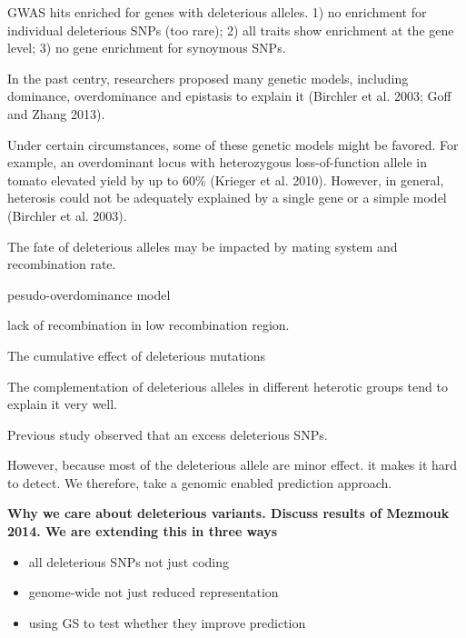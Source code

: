 \documentclass[10pt]{article}
\begin{document}
GWAS hits enriched for genes with deleterious alleles. 1) no enrichment for individual deleterious SNPs (too rare); 2) all traits show enrichment at the gene level; 3) no gene enrichment for synoymous SNPs.











In the past centry, researchers proposed many genetic models, including dominance, overdominance and epistasis to explain it (Birchler et al. 2003; Goff and Zhang 2013). 

Under certain circumstances, some of these genetic models might be favored. For example, an overdominant locus with heterozygous loss-of-function allele in tomato elevated yield by up to 60\% (Krieger et al. 2010). However, in general, heterosis could not be adequately explained by a single gene or a simple model (Birchler et al. 2003).


The fate of deleterious alleles may be impacted by mating system and recombination rate.   


pesudo-overdominance model

lack of recombination in low recombination region. 

The cumulative effect of deleterious mutations 


The complementation of deleterious alleles in different heterotic groups tend to explain it very well.

Previous study observed that an excess deleterious SNPs.

However, because most of the deleterious allele are minor effect. it makes it hard to detect. We therefore, take a genomic enabled prediction approach. 



\textbf{Why we care about deleterious variants. Discuss results of Mezmouk 2014. We are extending this in three ways}  
\begin{itemize}
  \item all deleterious SNPs not just coding
  \item genome-wide not just reduced representation
  \item using GS to test whether they improve prediction
\end{itemize}







\end{document}

